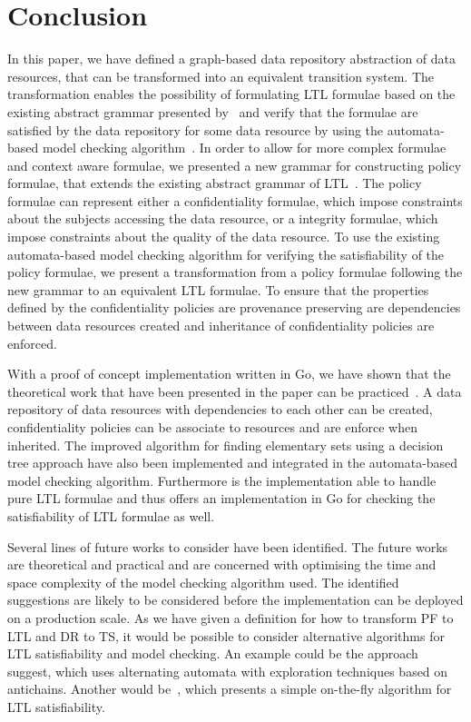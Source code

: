 \section{Conclusion}
In this paper, we have defined a graph-based data repository abstraction of data resources, that can be transformed into an equivalent transition system. The transformation enables the possibility of formulating LTL formulae based on the existing abstract grammar presented by~\cite{baier2008principles} and verify that the formulae are satisfied by the data repository for some data resource by using the automata-based model checking algorithm~\cite{baier2008principles}. In order to allow for more complex formulae and context aware formulae, we presented a new grammar for constructing policy formulae, that extends the existing abstract grammar of LTL~\cite{baier2008principles}. The policy formulae can represent either a confidentiality formulae, which impose constraints about the subjects accessing the data resource, or a integrity formulae, which impose constraints about the quality of the data resource. To use the existing automata-based model checking algorithm for verifying the satisfiability of the policy formulae, we present a transformation from a policy formulae following the new grammar to an equivalent LTL formulae. To ensure that the properties defined by the confidentiality policies are provenance preserving are dependencies between data resources created and inheritance of confidentiality policies are enforced.

With a proof of concept implementation written in Go, we have shown that the theoretical work that have been presented in the paper can be practiced~\cite{}. A data repository of data resources with dependencies to each other can be created, confidentiality policies can be associate to resources and are enforce when inherited. The improved algorithm for finding elementary sets using a decision tree approach have also been implemented and integrated in the automata-based model checking algorithm. Furthermore is the implementation able to handle pure LTL formulae and thus offers an implementation in Go for checking the satisfiability of LTL formulae as well.

Several lines of future works to consider have been identified. The future works are theoretical and practical and are concerned with optimising the time and space complexity of the model checking algorithm used. The identified suggestions are likely to be considered before the implementation can be deployed on a production scale. As we have given a definition for how to transform PF to LTL and DR to TS, it would be possible to consider alternative algorithms for LTL satisfiability and model checking. An example could be the approach~\cite{de2008antichains} suggest, which uses alternating automata  with exploration techniques based on antichains. Another would be~\cite{gerth1995simple}, which presents a simple on-the-fly algorithm for LTL satisfiability.
